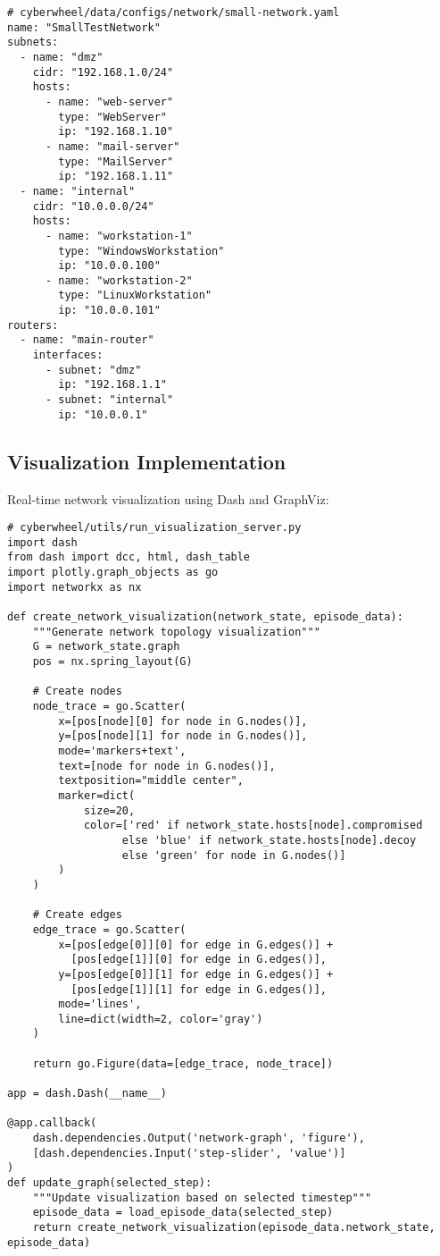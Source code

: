 \documentclass[12pt,a4paper]{article}
\begin{document}
\begin{lstlisting}[caption=Network Configuration Example]
# cyberwheel/data/configs/network/small-network.yaml
name: "SmallTestNetwork"
subnets:
  - name: "dmz"
    cidr: "192.168.1.0/24"
    hosts:
      - name: "web-server"
        type: "WebServer"
        ip: "192.168.1.10"
      - name: "mail-server"
        type: "MailServer"
        ip: "192.168.1.11"
  - name: "internal"
    cidr: "10.0.0.0/24"
    hosts:
      - name: "workstation-1"
        type: "WindowsWorkstation"
        ip: "10.0.0.100"
      - name: "workstation-2"
        type: "LinuxWorkstation"
        ip: "10.0.0.101"
routers:
  - name: "main-router"
    interfaces:
      - subnet: "dmz"
        ip: "192.168.1.1"
      - subnet: "internal"
        ip: "10.0.0.1"
\end{lstlisting}

\subsection{Visualization Implementation}
Real-time network visualization using Dash and GraphViz:

\begin{lstlisting}[caption=Visualization Server Implementation]
# cyberwheel/utils/run_visualization_server.py
import dash
from dash import dcc, html, dash_table
import plotly.graph_objects as go
import networkx as nx

def create_network_visualization(network_state, episode_data):
    """Generate network topology visualization"""
    G = network_state.graph
    pos = nx.spring_layout(G)
    
    # Create nodes
    node_trace = go.Scatter(
        x=[pos[node][0] for node in G.nodes()],
        y=[pos[node][1] for node in G.nodes()],
        mode='markers+text',
        text=[node for node in G.nodes()],
        textposition="middle center",
        marker=dict(
            size=20,
            color=['red' if network_state.hosts[node].compromised 
                  else 'blue' if network_state.hosts[node].decoy 
                  else 'green' for node in G.nodes()]
        )
    )
    
    # Create edges
    edge_trace = go.Scatter(
        x=[pos[edge[0]][0] for edge in G.edges()] + 
          [pos[edge[1]][0] for edge in G.edges()],
        y=[pos[edge[0]][1] for edge in G.edges()] + 
          [pos[edge[1]][1] for edge in G.edges()],
        mode='lines',
        line=dict(width=2, color='gray')
    )
    
    return go.Figure(data=[edge_trace, node_trace])

app = dash.Dash(__name__)

@app.callback(
    dash.dependencies.Output('network-graph', 'figure'),
    [dash.dependencies.Input('step-slider', 'value')]
)
def update_graph(selected_step):
    """Update visualization based on selected timestep"""
    episode_data = load_episode_data(selected_step)
    return create_network_visualization(episode_data.network_state, episode_data)
\end{lstlisting}
\end{document}
